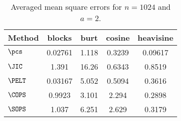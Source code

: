 \begin{table}[ht]
\centering
\begin{tabular}{lcccc}
  \hline
Method & blocks & burt & cosine & heavisine \\ 
  \hline
$\pcs$ & 0.02761 & 1.118 & 0.3239 & 0.09617 \\ 
  $\JIC$ & 1.391 & 16.26 & 0.6343 & 0.8519 \\ 
  $\PELT$ & 0.03167 & 5.052 & 0.5094 & 0.3616 \\ 
  $\COPS$ & 0.9923 & 3.101 & 2.294 & 0.2898 \\ 
  $\SOPS$ & 1.037 & 6.251 & 2.629 & 0.3179 \\ 
   \hline
\end{tabular}
\caption{Averaged mean square errors for $n = 1024$ and $a = 2$.} 
\label{tab:aMSEn1024a2}
\end{table}
